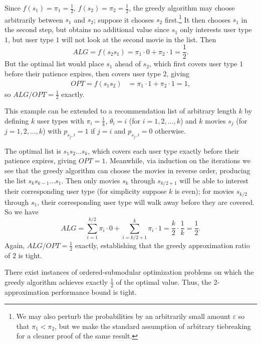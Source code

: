 Since $f(s_1) = \pi_1 = \frac{1}{2}$, $f(s_2) = \pi_2 = \frac{1}{2}$, the greedy algorithm may choose arbitrarily between $s_1$ and $s_2$; suppose it chooses $s_2$ first.\footnote{We may also perturb the probabilities by an arbitrarily small amount $\varepsilon$ so that $\pi_1 < \pi_2$, but we make the standard assumption of arbitrary tiebreaking for a cleaner proof of the same result.} It then chooses $s_1$ in the second step, but obtains no additional value since $s_1$ only interests user type $1$, but user type $1$ will not look at the second movie in the list. Then $$ALG = f(s_2 s_1) = \pi_1 \cdot 0 + \pi_2 \cdot 1 = \frac{1}{2}.$$
But the optimal list would place $s_1$ ahead of $s_2$, which first covers user type $1$ before their patience expires, then covers user type $2$, giving 
\begin{align*}
    OPT = f(s_1 s_2) &= \pi_1 \cdot 1 + \pi_2 \cdot 1 = 1,
\end{align*}
so $ALG/OPT = \frac{1}{2}$ exactly.

This example can be extended to a recommendation list of arbitrary length $k$ by defining $k$ user types with $\pi_i = \frac{1}{k}$, $\theta_i = i$ (for $i = 1, 2, \dots, k$) and $k$ movies $s_j$ (for $j = 1, 2, \dots, k$) with $p_{s_j, i} = 1$ if $j = i$ and $p_{s_j, i} = 0$ otherwise.

The optimal list is $s_1 s_2 \dots s_k$, which covers each user type exactly before their patience expires, giving $OPT = 1$. Meanwhile, via induction on the iterations we see that the greedy algorithm can
choose the movies in reverse order, producing the list $s_k s_{k-1} \dots s_1$. Then only movies $s_k$ through $s_{k/2 + 1}$ will be able to interest their corresponding user type (for simplicity suppose $k$ is even); for movies $s_{k/2}$ through $s_1$, their corresponding user type will walk away before they are covered. So we have $$ALG = \sum_{i=1}^{k/2} \pi_i \cdot 0 + \sum_{i=k/2 + 1}^k \pi_i \cdot 1 = \frac{k}{2} \cdot \frac{1}{k} = \frac{1}{2}.$$
Again, $ALG/OPT = \frac{1}{2}$ exactly, establishing that the greedy approximation ratio of $2$ is tight.

\begin{thm}
There exist instances of ordered-submodular optimization problems on which the greedy algorithm achieves exactly $\frac{1}{2}$ of the optimal value. Thus, the 2-approximation performance bound is tight.
\end{thm}

% 